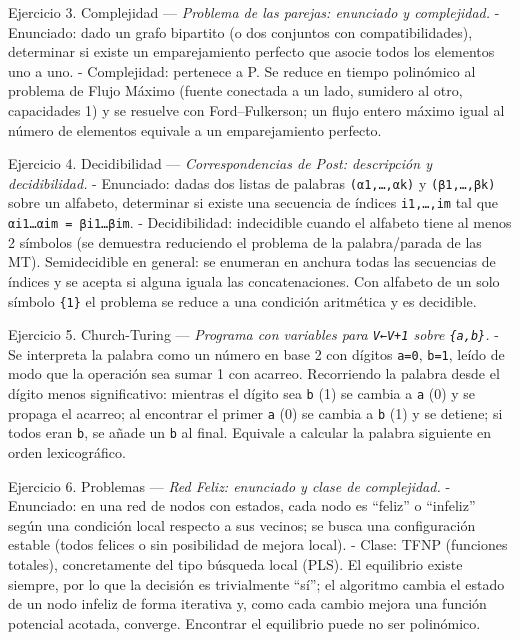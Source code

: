 \documentclass[12pt]{book} %
\begin{document}
Ejercicio 3. Complejidad --- \emph{Problema de las parejas: enunciado y
complejidad.} - Enunciado: dado un grafo bipartito (o dos conjuntos con
compatibilidades), determinar si existe un emparejamiento perfecto que
asocie todos los elementos uno a uno. - Complejidad: pertenece a P. Se
reduce en tiempo polinómico al problema de Flujo Máximo (fuente
conectada a un lado, sumidero al otro, capacidades 1) y se resuelve con
Ford--Fulkerson; un flujo entero máximo igual al número de elementos
equivale a un emparejamiento perfecto.

Ejercicio 4. Decidibilidad --- \emph{Correspondencias de Post:
descripción y decidibilidad.} - Enunciado: dadas dos listas de palabras
\texttt{(α1,…,αk)} y \texttt{(β1,…,βk)} sobre un alfabeto, determinar si
existe una secuencia de índices \texttt{i1,…,im} tal que
\texttt{αi1…αim\ =\ βi1…βim}. - Decidibilidad: indecidible cuando el
alfabeto tiene al menos 2 símbolos (se demuestra reduciendo el problema
de la palabra/parada de las MT). Semidecidible en general: se enumeran
en anchura todas las secuencias de índices y se acepta si alguna iguala
las concatenaciones. Con alfabeto de un solo símbolo \texttt{\{1\}} el
problema se reduce a una condición aritmética y es decidible.

Ejercicio 5. Church-Turing --- \emph{Programa con variables para
\texttt{V←V+1} sobre \texttt{\{a,b\}}.} - Se interpreta la palabra como
un número en base 2 con dígitos \texttt{a=0}, \texttt{b=1}, leído de
modo que la operación sea sumar 1 con acarreo. Recorriendo la palabra
desde el dígito menos significativo: mientras el dígito sea \texttt{b}
(1) se cambia a \texttt{a} (0) y se propaga el acarreo; al encontrar el
primer \texttt{a} (0) se cambia a \texttt{b} (1) y se detiene; si todos
eran \texttt{b}, se añade un \texttt{b} al final. Equivale a calcular la
palabra siguiente en orden lexicográfico.

Ejercicio 6. Problemas --- \emph{Red Feliz: enunciado y clase de
complejidad.} - Enunciado: en una red de nodos con estados, cada nodo es
``feliz'' o ``infeliz'' según una condición local respecto a sus
vecinos; se busca una configuración estable (todos felices o sin
posibilidad de mejora local). - Clase: TFNP (funciones totales),
concretamente del tipo búsqueda local (PLS). El equilibrio existe
siempre, por lo que la decisión es trivialmente ``sí''; el algoritmo
cambia el estado de un nodo infeliz de forma iterativa y, como cada
cambio mejora una función potencial acotada, converge. Encontrar el
equilibrio puede no ser polinómico.
\end{document}
